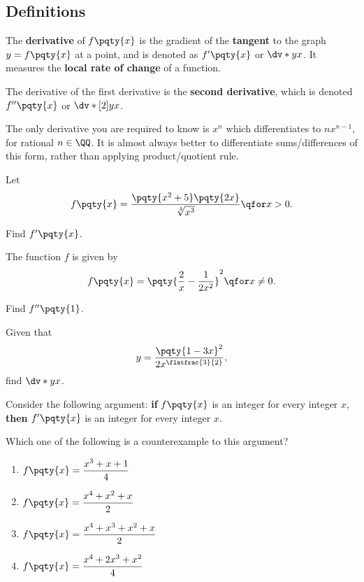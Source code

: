 \documentclass{article}
\begin{document}
\subsection{Definitions}

The \textbf{derivative} of \(f\pqty{x}\) is the gradient of the \textbf{tangent} to the graph \(y = f\pqty{x}\) at a point, and is denoted as \(f'\pqty{x}\) or \(\dv*{y}{x}\). It measures the \textbf{local rate of change} of a function.

The derivative of the first derivative is the \textbf{second derivative}, which is denoted \(f''\pqty{x}\) or \(\dv*[2]{y}{x}\).

The only derivative you are required to know is \(x^n\) which differentiates to \(n x^{n - 1}\), for rational \(n \in \QQ\). It is almost always better to differentiate sums/differences of this form, rather than applying product/quotient rule.

\begin{example}[TMUA 2016 P2 Q2]
    Let
    \[
        f\pqty{x} = \frac{\pqty{x^2 + 5} \pqty{2x}}{\sqrt[4]{x^3}} \qfor x > 0.
    \]  

    Find \(f'\pqty{x}\).
\end{example}

\begin{example}[TMUA 2017 P1 Q2]
    The function \(f\) is given by
    \[
        f\pqty{x} = \pqty{\frac{2}{x} - \frac{1}{2x^2}}^2 \qfor x \neq 0.
    \]

    Find \(f''\pqty{1}\).
\end{example}

\begin{example}[TMUA 2017 P2 Q1]
    Given that
    \[
        y = \frac{\pqty{1 - 3x}^2}{2 x^{\flatfrac{3}{2}}},
    \]
    find \(\dv*{y}{x}\).
\end{example}

\begin{example}[TMUA 2017 P2 Q16]
    Consider the following argument: \textbf{if} \(f\pqty{x}\) is an integer for every integer \(x\), \textbf{then} \(f'\pqty{x}\) is an integer for every integer \(x\).

    Which one of the following is a counterexample to this argument?

    \begin{enumerate}[label=\Alph*.]
        \item \(f\pqty{x} = \dfrac{x^3 + x + 1}{4}\)
        \item \(f\pqty{x} = \dfrac{x^4 + x^2 + x}{2}\)
        \item \(f\pqty{x} = \dfrac{x^4 + x^3 + x^2 + x}{2}\)
        \item \(f\pqty{x} = \dfrac{x^4 + 2 x^3 + x^2}{4}\)
    \end{enumerate}
\end{example}
\end{document}
